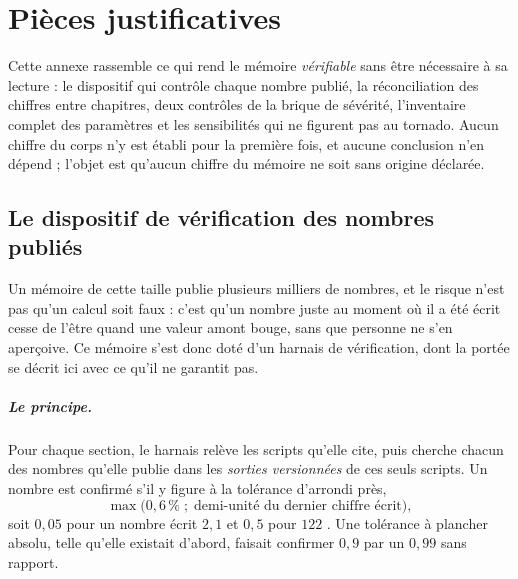 \chapter{Pièces justificatives}
\label{ann:pieces}

Cette annexe rassemble ce qui rend le mémoire \emph{vérifiable} sans être nécessaire à sa
lecture : le dispositif qui contrôle chaque nombre publié, la réconciliation des chiffres entre
chapitres, deux contrôles de la brique de sévérité, l'inventaire complet des paramètres et les
sensibilités qui ne figurent pas au tornado. Aucun chiffre du corps n'y est établi pour la
première fois, et aucune conclusion n'en dépend ; l'objet est qu'aucun chiffre du mémoire ne soit
sans origine déclarée.

\section{Le dispositif de vérification des nombres publiés}
\label{sec:ann-harnais}

Un mémoire de cette taille publie plusieurs milliers de nombres, et le risque n'est pas qu'un
calcul soit faux : c'est qu'un nombre juste au moment où il a été écrit cesse de l'être quand une
valeur amont bouge, sans que personne ne s'en aperçoive. Ce mémoire s'est donc doté d'un harnais
de vérification, dont la portée se décrit ici avec ce qu'il ne garantit pas.

\paragraph{Le principe.} Pour chaque section, le harnais relève les scripts qu'elle cite, puis
cherche chacun des nombres qu'elle publie dans les \emph{sorties versionnées} de ces seuls
scripts. Un nombre est confirmé s'il y figure à la tolérance d'arrondi près,
\[
  \max\bigl(0{,}6\,\% \;;\; \text{demi-unité du dernier chiffre écrit}\bigr),
\]
soit $0{,}05$ pour un nombre écrit \og $2{,}1$ \fg{} et $0{,}5$ pour \og $122$ \fg{}. Une tolérance à plancher absolu,
telle qu'elle existait d'abord, faisait confirmer $0{,}9$ par un $0{,}99$ sans rapport.

